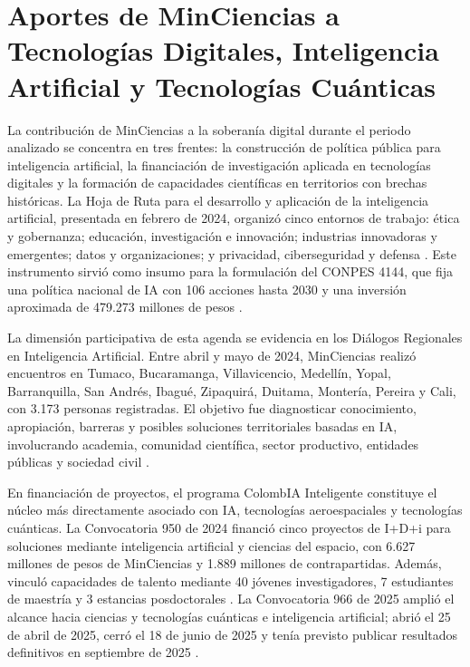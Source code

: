 \section{Aportes de MinCiencias a Tecnologías Digitales, Inteligencia Artificial y Tecnologías Cuánticas}

La contribución de MinCiencias a la soberanía digital durante el periodo analizado se concentra en tres frentes: la construcción de política pública para inteligencia artificial, la financiación de investigación aplicada en tecnologías digitales y la formación de capacidades científicas en territorios con brechas históricas. La Hoja de Ruta para el desarrollo y aplicación de la inteligencia artificial, presentada en febrero de 2024, organizó cinco entornos de trabajo: ética y gobernanza; educación, investigación e innovación; industrias innovadoras y emergentes; datos y organizaciones; y privacidad, ciberseguridad y defensa \parencite{minciencias_hoja_ruta_ia_pdf_2024,minciencias_informe_gestion_2024_pdf}. Este instrumento sirvió como insumo para la formulación del CONPES 4144, que fija una política nacional de IA con 106 acciones hasta 2030 y una inversión aproximada de 479.273 millones de pesos \parencite{conpes_4144_ia_pdf_2025}.

La dimensión participativa de esta agenda se evidencia en los Diálogos Regionales en Inteligencia Artificial. Entre abril y mayo de 2024, MinCiencias realizó encuentros en Tumaco, Bucaramanga, Villavicencio, Medellín, Yopal, Barranquilla, San Andrés, Ibagué, Zipaquirá, Duitama, Montería, Pereira y Cali, con 3.173 personas registradas. El objetivo fue diagnosticar conocimiento, apropiación, barreras y posibles soluciones territoriales basadas en IA, involucrando academia, comunidad científica, sector productivo, entidades públicas y sociedad civil \parencite{minciencias_dialogos_ia_pdf_2024}.

En financiación de proyectos, el programa ColombIA Inteligente constituye el núcleo más directamente asociado con IA, tecnologías aeroespaciales y tecnologías cuánticas. La Convocatoria 950 de 2024 financió cinco proyectos de I+D+i para soluciones mediante inteligencia artificial y ciencias del espacio, con 6.627 millones de pesos de MinCiencias y 1.889 millones de contrapartidas. Además, vinculó capacidades de talento mediante 40 jóvenes investigadores, 7 estudiantes de maestría y 3 estancias posdoctorales \parencite{minciencias_rendicion_2024_2025_pdf}. La Convocatoria 966 de 2025 amplió el alcance hacia ciencias y tecnologías cuánticas e inteligencia artificial; abrió el 25 de abril de 2025, cerró el 18 de junio de 2025 y tenía previsto publicar resultados definitivos en septiembre de 2025 \parencite{minciencias_rendicion_2024_2025_pdf}.

